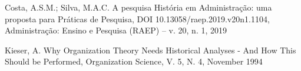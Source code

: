 \documentclass[
12pt,		%
openright,	%
twoside,  %
a4paper,			%
chapter=TITLE,		%
english,			%
french,				%
spanish,			%
brazil				%
]{USPSC-classe/USPSC}
\begin{document}
\begin{flushleft}
\begin{flushleft}
\begin{flushleft}
\begin{flushleft}
\begin{flushleft}
\begin{flushleft}
\begin{flushleft}
\begin{flushleft}
 Costa, A.S.M.; Silva, M.A.C. A pesquisa Hist\'oria em Administra\c{c}\~ao: uma proposta para Pr\'aticas de Pesquisa, DOI 10.13058/raep.2019.v20n1.1104, Administra\c{c}\~ao: Ensino e Pesquisa (RAEP) – v. 20, n. 1, 2019
\end{flushleft}


\end{flushleft}


\end{flushleft}


\end{flushleft}


\end{flushleft}


\end{flushleft}


\end{flushleft}


\end{flushleft}


\begin{flushleft}
\begin{flushleft}
\begin{flushleft}
\begin{flushleft}
\begin{flushleft}
\begin{flushleft}
\begin{flushleft}
\begin{flushleft}
[Kieser, 1994] Kieser, A. Why Organization Theory Needs Historical Analyses - And How This Should be Performed, Organization Science, V. 5, N. 4, November 1994
\end{flushleft}


\end{flushleft}


\end{flushleft}


\end{flushleft}


\end{flushleft}


\end{flushleft}


\end{flushleft}


\end{flushleft}
\end{document}
